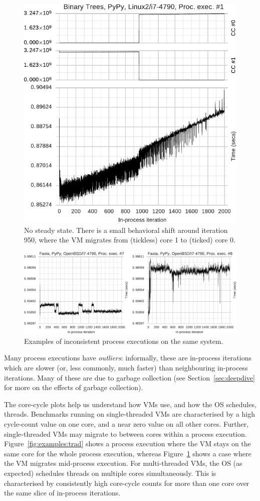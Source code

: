 \documentclass[preprint,numbers,10pt]{sigplanconf}
\begin{document}
\begin{figure}[t]
\centering
\includegraphics[width=.45\textwidth]{examples/new_no_steady.pdf}
\caption{No steady state. There is a small behavioral shift around iteration
950, where the VM migrates from (tickless) core 1 to (ticked) core 0.}
\label{fig:examples:neverending}
\end{figure}

\begin{figure}[t!]
\centering
\includegraphics[width=\textwidth]{examples/new_inconsistent.pdf}
\caption{Examples of inconsistent process executions on the same system.}
\label{fig:examples:inconsistent}
\end{figure}

Many process executions have \emph{outliers}: informally, these are in-process
iterations which are slower (or, less commonly, much faster) than neighbouring
in-process iterations. Many of these are due to garbage collection (see
Section~\ref{sec:deepdive} for more on the effects of garbage collection).

The core-cycle plots help us understand how VMs use, and how the OS schedules,
threads. Benchmarks running on single-threaded VMs are characterised by a high
cycle-count value on one core, and a near zero value on all other cores.
Further, single-threaded VMs may migrate to between cores within a process
execution. Figure~\ref{fig:examples:trad} shows a process execution where the
VM stays on the same core for the whole process execution, whereas
Figure~\ref{fig:examples:neverending} shows a case where the VM migrates
mid-process
execution. For multi-threaded VMs, the OS (as expected) schedules threads on
multiple cores simultaneously. This is characterised by consistently high
core-cycle counts for more than one core over the same slice of in-process iterations.
\end{document}
